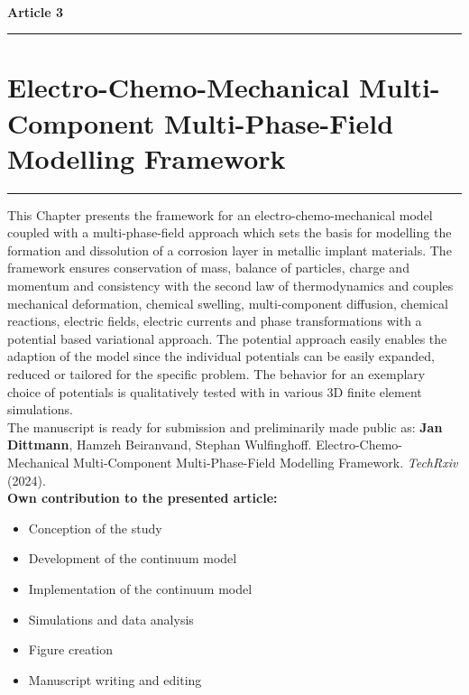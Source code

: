 \ \vspace{1cm} \\
{\Large \bf Article 3}
\normalsize
\vspace{0.3cm}
\hrule
\section*{\Large \centering Electro-Chemo-Mechanical Multi-Component Multi-Phase-Field Modelling Framework}
\hrule
\vspace{1.5cm}

This Chapter presents the framework for an electro-chemo-mechanical model coupled with a multi-phase-field approach which sets the basis for modelling the formation and dissolution of a corrosion layer in metallic implant materials. The framework ensures conservation of mass, balance of particles, charge and momentum and consistency with the second law of thermodynamics and couples mechanical deformation, chemical swelling, multi-component diffusion, chemical reactions, electric fields, electric currents and phase transformations with a potential based variational approach. The potential approach easily enables the adaption of the model since the individual potentials can be easily expanded, reduced or tailored for the specific problem. The behavior for an exemplary choice of potentials is qualitatively tested with in various 3D finite element simulations.  \\

The manuscript is ready for submission and preliminarily made public as: \textbf{Jan Dittmann}, Hamzeh Beiranvand, Stephan Wulfinghoff. Electro-Chemo-Mechanical Multi-Component Multi-Phase-Field Modelling Framework. \textit{TechRxiv} (2024). \\

\textbf{Own contribution to the presented article:}
\begin{itemize}
\item Conception of the study
\item Development of the continuum model
\item Implementation of the continuum model
\item Simulations and data analysis
\item Figure creation 
\item Manuscript writing and editing
\end{itemize}

